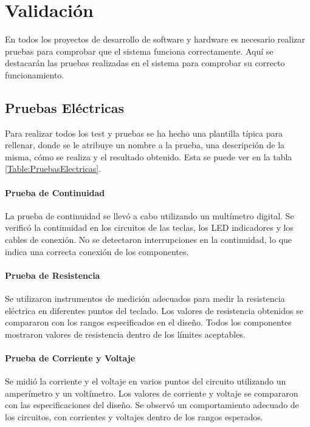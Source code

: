 \chapter{Validación}

En todos los proyectos de desarrollo de software y hardware es necesario realizar pruebas para comprobar que el sistema funciona correctamente. Aquí se destacarán las pruebas realizadas en el sistema para comprobar su correcto funcionamiento.

\section{Pruebas Eléctricas}
Para realizar todos los test y pruebas se ha hecho una plantilla típica para rellenar, donde se le atribuye un nombre a la prueba, una descripción de la misma, cómo se realiza y el resultado obtenido. Esta se puede ver en la tabla \ref{Table:PruebasElectricas}.

\subsubsection{Prueba de Continuidad}

La prueba de continuidad se llevó a cabo utilizando un multímetro digital. Se verificó la continuidad en los circuitos de las teclas, los \gls{LED} indicadores y los cables de conexión. No se detectaron interrupciones en la continuidad, lo que indica una correcta conexión de los componentes.

\subsubsection{Prueba de Resistencia}

Se utilizaron instrumentos de medición adecuados para medir la resistencia eléctrica en diferentes puntos del teclado. Los valores de resistencia obtenidos se compararon con los rangos especificados en el diseño. Todos los componentes mostraron valores de resistencia dentro de los límites aceptables.

\subsubsection{Prueba de Corriente y Voltaje}

Se midió la corriente y el voltaje en varios puntos del circuito utilizando un amperímetro y un voltímetro. Los valores de corriente y voltaje se compararon con las especificaciones del diseño. Se observó un comportamiento adecuado de los circuitos, con corrientes y voltajes dentro de los rangos esperados.

